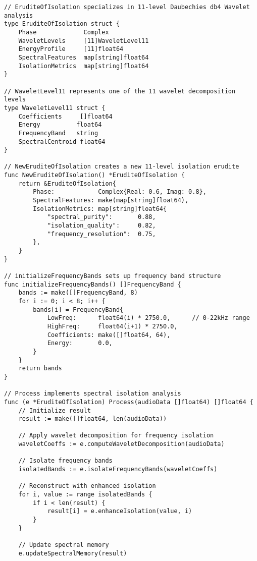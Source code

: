 \begin{tcolorbox}[colback=CodeBackground, colframe=DarkGray, title=Erudite of Isolation Implementation, fonttitle=\bfseries]
\begin{verbatim}
// EruditeOfIsolation specializes in 11-level Daubechies db4 Wavelet analysis
type EruditeOfIsolation struct {
    Phase             Complex
    WaveletLevels     [11]WaveletLevel11
    EnergyProfile     [11]float64
    SpectralFeatures  map[string]float64
    IsolationMetrics  map[string]float64
}

// WaveletLevel11 represents one of the 11 wavelet decomposition levels
type WaveletLevel11 struct {
    Coefficients     []float64
    Energy          float64
    FrequencyBand   string
    SpectralCentroid float64
}

// NewEruditeOfIsolation creates a new 11-level isolation erudite
func NewEruditeOfIsolation() *EruditeOfIsolation {
    return &EruditeOfIsolation{
        Phase:            Complex{Real: 0.6, Imag: 0.8},
        SpectralFeatures: make(map[string]float64),
        IsolationMetrics: map[string]float64{
            "spectral_purity":       0.88,
            "isolation_quality":     0.82,
            "frequency_resolution":  0.75,
        },
    }
}

// initializeFrequencyBands sets up frequency band structure
func initializeFrequencyBands() []FrequencyBand {
    bands := make([]FrequencyBand, 8)
    for i := 0; i < 8; i++ {
        bands[i] = FrequencyBand{
            LowFreq:      float64(i) * 2750.0,      // 0-22kHz range
            HighFreq:     float64(i+1) * 2750.0,
            Coefficients: make([]float64, 64),
            Energy:       0.0,
        }
    }
    return bands
}

// Process implements spectral isolation analysis
func (e *EruditeOfIsolation) Process(audioData []float64) []float64 {
    // Initialize result
    result := make([]float64, len(audioData))
    
    // Apply wavelet decomposition for frequency isolation
    waveletCoeffs := e.computeWaveletDecomposition(audioData)
    
    // Isolate frequency bands
    isolatedBands := e.isolateFrequencyBands(waveletCoeffs)
    
    // Reconstruct with enhanced isolation
    for i, value := range isolatedBands {
        if i < len(result) {
            result[i] = e.enhanceIsolation(value, i)
        }
    }
    
    // Update spectral memory
    e.updateSpectralMemory(result)
    

\end{verbatim}
\end{tcolorbox}
